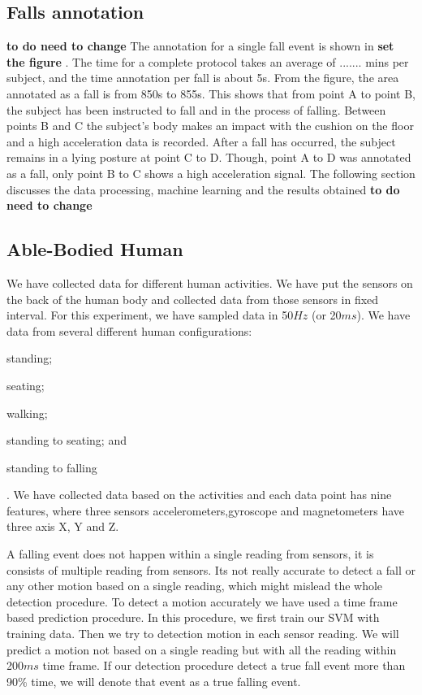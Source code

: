 \documentclass[letterpaper]{article}
\begin{document}
\subsection{Falls annotation}
\textbf{to do need to change}
The annotation for a single fall event is shown in \textbf{{set the figure} }. The time for a 
complete protocol takes an average of ....... mins
per subject, and the time annotation per fall is about 5s. From
the figure, the area annotated as a fall is from 850s to 855s.
This shows that from point A to point B, the subject has been
instructed to fall and in the process of falling. Between points
B and C the subject’s body makes an impact with the cushion
on the floor and a high acceleration data is recorded. After a
fall has occurred, the subject remains in a lying posture at point
C to D. Though, point A to D was annotated as a fall, only
point B to C shows a high acceleration signal. The following
section discusses the data processing, machine learning and
the results obtained
\textbf{to do need to change}


\subsection{Able-Bodied Human}

We have collected data for different human activities. We have put the sensors on the back of the
human body and collected data from those sensors in fixed interval. For this experiment, we have
sampled data in 50$Hz$ (or 20$ms$). We have data from several different human configurations:
\begin{inparaenum}[(1)] \item standing; \item seating; \item walking; \item standing to seating;
and \item standing to falling\end{inparaenum}. We have collected data based on the activities and
each data point has nine features, where three sensors accelerometers,gyroscope and magnetometers have three axis X, Y and Z.

\par
A falling event does not happen within a single reading from sensors, it is consists of multiple
reading from sensors.  Its not really accurate to detect a fall or any other motion based on a
single reading, which might mislead the whole detection procedure. To detect a motion accurately we
have used a time frame based prediction procedure. In this procedure, we first train our SVM with
training data. Then we try to detection motion in each sensor reading. We will predict a motion not
based on a single reading but with all the reading within 200$ms$ time frame. If our detection
procedure detect a true fall event more than 90\% time, we will denote that event as a true
falling event.
\end{document}
